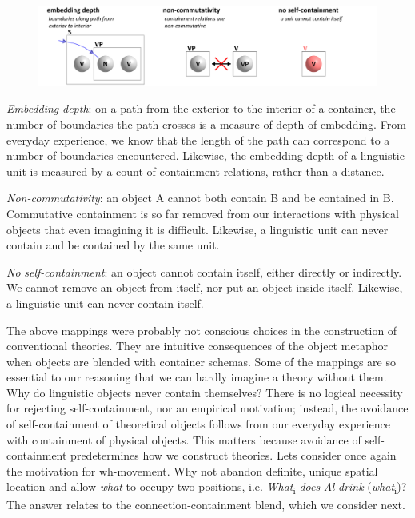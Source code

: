   
\begin{figure}
\includegraphics[width=\textwidth]{figures/Tilsen-img33.png}
\caption{\missingcaption}
\label{fig:}
\end{figure}
 

\textit{Embedding} \textit{depth}: on a path from the exterior to the interior of a container, the number of boundaries the path crosses is a measure of depth of embedding. From everyday experience, we know that the length of the path can correspond to a number of boundaries encountered. Likewise, the embedding depth of a linguistic unit is measured by a count of containment relations, rather than a distance.

\textit{Non-commutativity}: an object A cannot both contain B and be contained in B. Commutative containment is so far removed from our interactions with physical objects that even imagining it is difficult. Likewise, a linguistic unit can never contain and be contained by the same unit.

\textit{No} \textit{self-containment}: an object cannot contain itself, either directly or indirectly. We cannot remove an object from itself, nor put an object inside itself. Likewise, a linguistic unit can never contain itself. 

  The above mappings were probably not conscious choices in the construction of conventional theories. They are intuitive consequences of the object metaphor when objects are blended with container schemas. Some of the mappings are so essential to our reasoning that we can hardly imagine a theory without them. Why do linguistic objects never contain themselves? There is no logical necessity for rejecting self-containment, nor an empirical motivation; instead, the avoidance of self-containment of theoretical objects follows from our everyday experience with containment of physical objects. This matters because avoidance of self-containment predetermines how we construct theories. Lets consider once again the motivation for wh-movement. Why not abandon definite, unique spatial location and allow \textit{what} to occupy two positions, i.e. \textit{What}\textsubscript{i} \textit{does} \textit{Al} \textit{drink} (\textit{what}\textsubscript{i})? The answer relates to the connection-containment blend, which we consider next.

